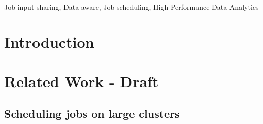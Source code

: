 \documentclass[conference,10pt]{IEEEtran}
\begin{document}
\begin{abstract}
  
  

  
\end{abstract}


\begin{IEEEkeywords}
Job input sharing,
Data-aware,
Job scheduling,
High Performance Data Analytics
\end{IEEEkeywords}

\section{Introduction}\label{sec.introduction}


\section{Related Work - Draft}\label{sec.related_work}

\subsection{Scheduling jobs on large clusters}
\end{document}
